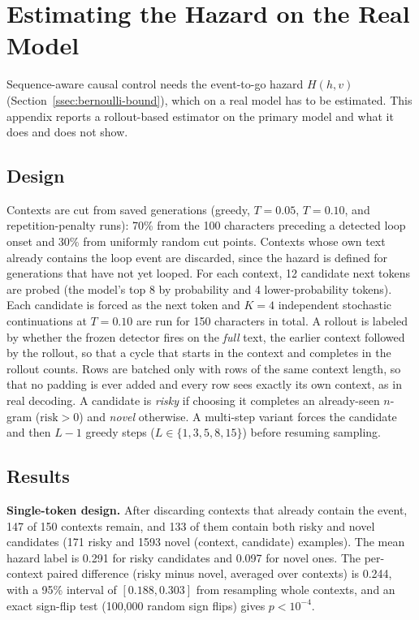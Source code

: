 \documentclass[11pt]{article}
\newcommand{\risk}{\mathrm{risk}}
\begin{document}
\section{Estimating the Hazard on the Real Model}
\label{sec:hazard-transfer}

Sequence-aware causal control needs the event-to-go hazard $H(h,v)$ (Section~\ref{ssec:bernoulli-bound}), which on a real model has to be estimated. This appendix reports a rollout-based estimator on the primary model and what it does and does not show.

\subsection{Design}
Contexts are cut from saved generations (greedy, $T{=}0.05$, $T{=}0.10$, and repetition-penalty runs): 70\% from the 100 characters preceding a detected loop onset and 30\% from uniformly random cut points. Contexts whose own text already contains the loop event are discarded, since the hazard is defined for generations that have not yet looped. For each context, 12 candidate next tokens are probed (the model's top 8 by probability and 4 lower-probability tokens). Each candidate is forced as the next token and $K{=}4$ independent stochastic continuations at $T{=}0.10$ are run for 150 characters in total. A rollout is labeled by whether the frozen detector fires on the \emph{full} text, the earlier context followed by the rollout, so that a cycle that starts in the context and completes in the rollout counts. Rows are batched only with rows of the same context length, so that no padding is ever added and every row sees exactly its own context, as in real decoding. A candidate is \emph{risky} if choosing it completes an already-seen $n$-gram ($\risk>0$) and \emph{novel} otherwise. A multi-step variant forces the candidate and then $L{-}1$ greedy steps ($L\in\{1,3,5,8,15\}$) before resuming sampling.

\subsection{Results}
\textbf{Single-token design.} After discarding contexts that already contain the event, 147 of 150 contexts remain, and 133 of them contain both risky and novel candidates (171 risky and 1593 novel (context, candidate) examples). The mean hazard label is 0.291 for risky candidates and 0.097 for novel ones. The per-context paired difference (risky minus novel, averaged over contexts) is 0.244, with a 95\% interval of $[0.188,0.303]$ from resampling whole contexts, and an exact sign-flip test (100{,}000 random sign flips) gives $p<10^{-4}$.
\end{document}
